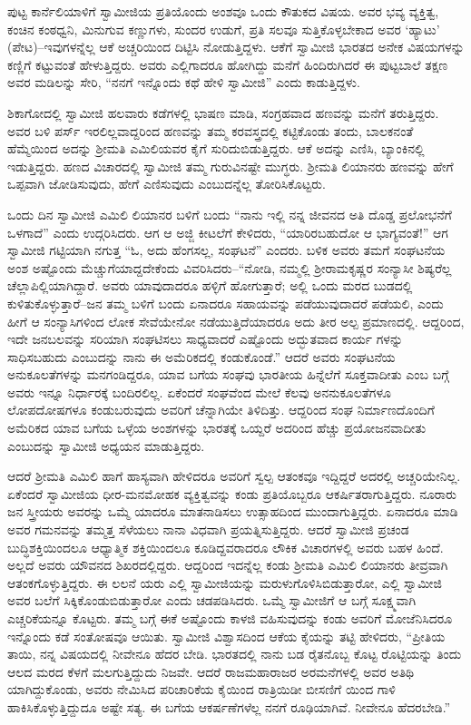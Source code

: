 ಪುಟ್ಟ ಕಾರ್ನೆಲಿಯಾಳಿಗೆ ಸ್ವಾಮೀಜಿಯ ಪ್ರತಿಯೊಂದು ಅಂಶವೂ ಒಂದು ಕೌತುಕದ ವಿಷಯ. ಅವರ ಭವ್ಯ ವ್ಯಕ್ತಿತ್ವ, ಕಂಚಿನ ಕಂಠಧ್ವನಿ, ಮಿನುಗುವ ಕಣ್ಣುಗಳು, ಸುಂದರ ಉಡುಗೆ, ಪ್ರತಿ ಸಲವೂ ಸುತ್ತಿಕೊಳ್ಳಬೇಕಾದ ಅವರ ‘ಹ್ಯಾಟು’ (ಪೇಟ)–ಇವುಗಳನ್ನೆಲ್ಲ ಆಕೆ ಅಚ್ಚರಿಯಿಂದ ದಿಟ್ಟಿಸಿ ನೋಡುತ್ತಿದ್ದಳು. ಆಕೆಗೆ ಸ್ವಾಮೀಜಿ ಭಾರತದ ಅನೇಕ ವಿಷಯಗಳನ್ನು ಕಣ್ಣಿಗೆ ಕಟ್ಟುವಂತೆ ಹೇಳುತ್ತಿದ್ದರು. ಅವರು ಎಲ್ಲಿಗಾದರೂ ಹೋಗಿದ್ದು ಮನೆಗೆ ಹಿಂದಿರುಗಿದರೆ ಈ ಪುಟ್ಟಬಾಲೆ ತಕ್ಷಣ ಅವರ ಮಡಿಲನ್ನು ಸೇರಿ, “ನನಗೆ ಇನ್ನೊಂದು ಕಥೆ ಹೇಳಿ ಸ್ವಾಮೀಜಿ” ಎಂದು ಕಾಡುತ್ತಿದ್ದಳು.

ಶಿಕಾಗೋದಲ್ಲಿ ಸ್ವಾಮೀಜಿ ಹಲವಾರು ಕಡೆಗಳಲ್ಲಿ ಭಾಷಣ ಮಾಡಿ, ಸಂಗ್ರಹವಾದ ಹಣವನ್ನು ಮನೆಗೆ ತರುತ್ತಿದ್ದರು. ಅವರ ಬಳಿ ಪರ್ಸ್ ಇರಲಿಲ್ಲವಾದ್ದರಿಂದ ಹಣವನ್ನು ತಮ್ಮ ಕರವಸ್ತ್ರದಲ್ಲಿ ಕಟ್ಟಿಕೊಂಡು ತಂದು, ಬಾಲಕನಂತೆ ಹೆಮ್ಮೆಯಿಂದ ಅದನ್ನು ಶ್ರೀಮತಿ ಎಮಿಲಿಯವರ ಕೈಗೆ ಸುರಿದುಬಿಡುತ್ತಿದ್ದರು. ಆಕೆ ಅದನ್ನು ಎಣಿಸಿ, ಬ್ಯಾಂಕಿನಲ್ಲಿ ಇಡುತ್ತಿದ್ದರು. ಹಣದ ವಿಚಾರದಲ್ಲಿ ಸ್ವಾಮೀಜಿ ತಮ್ಮ ಗುರುವಿನಷ್ಟೇ ಮುಗ್ಧರು. ಶ್ರೀಮತಿ ಲಿಯಾನರು ಹಣವನ್ನು ಹೇಗೆ ಒಪ್ಪವಾಗಿ ಜೋಡಿಸುವುದು, ಹೇಗೆ ಎಣಿಸುವುದು ಎಂಬುದನ್ನೆಲ್ಲ ತೋರಿಸಿಕೊಟ್ಟರು.

ಒಂದು ದಿನ ಸ್ವಾಮೀಜಿ ಎಮಿಲಿ ಲಿಯಾನರ ಬಳಿಗೆ ಬಂದು “ನಾನು ಇಲ್ಲಿ ನನ್ನ ಜೀವನದ ಅತಿ ದೊಡ್ಡ ಪ್ರಲೋಭನೆಗೆ ಒಳಗಾದೆ” ಎಂದು ಉದ್ಗರಿಸಿದರು. ಆಗ ಆ ಅಜ್ಜಿ ಕೀಟಲೆಗೆ ಕೇಳಿದರು, “ಯಾರಿರಬಹುದೋ ಆ ಭಾಗ್ಯವಂತೆ!” ಆಗ ಸ್ವಾಮೀಜಿ ಗಟ್ಟಿಯಾಗಿ ನಗುತ್ತ “ಓ, ಅದು ಹೆಂಗಸಲ್ಲ, ಸಂಘಟನೆ” ಎಂದರು. ಬಳಿಕ ಅವರು ತಮಗೆ ಸಂಘಟನೆಯ ಅಂಶ ಅಷ್ಟೊಂದು ಮೆಚ್ಚುಗೆಯಾದ್ದದೇಕೆಂದು ವಿವರಿಸಿದರು–“ನೋಡಿ, ನಮ್ಮಲ್ಲಿ ಶ್ರೀರಾಮಕೃಷ್ಣರ ಸಂನ್ಯಾಸೀ ಶಿಷ್ಯರೆಲ್ಲ ಚೆಲ್ಲಾಪಿಲ್ಲಿಯಾಗಿದ್ದಾರೆ. ಅವರು ಯಾವುದಾದರೂ ಹಳ್ಳಿಗೆ ಹೋಗುತ್ತಾರೆ; ಅಲ್ಲಿ ಒಂದು ಮರದ ಬುಡದಲ್ಲಿ ಕುಳಿತುಕೊಳ್ಳುತ್ತಾರೆ–ಜನ ತಮ್ಮ ಬಳಿಗೆ ಬಂದು ಏನಾದರೂ ಸಹಾಯವನ್ನು ಪಡೆಯುವುದಾದರೆ ಪಡೆಯಲಿ, ಎಂದು ಹೀಗೆ ಆ ಸಂನ್ಯಾಸಿಗಳಿಂದ ಲೋಕ ಸೇವೆಯೇನೋ ನಡೆಯುತ್ತಿದೆಯಾದರೂ ಅದು ತೀರ ಅಲ್ಪ ಪ್ರಮಾಣದಲ್ಲಿ. ಆದ್ದರಿಂದ, ಇದೇ ಜನಬಲವನ್ನು ಸರಿಯಾಗಿ ಸಂಘಟಿಸಲು ಸಾಧ್ಯವಾದರೆ ಎಷ್ಟೊಂದು ಅದ್ಭುತವಾದ ಕಾರ್ಯ ಗಳನ್ನು ಸಾಧಿಸಬಹುದು ಎಂಬುದನ್ನು ನಾನು ಈ ಅಮೆರಿಕದಲ್ಲಿ ಕಂಡುಕೊಂಡೆ.” ಆದರೆ ಅವರು ಸಂಘಟನೆಯ ಅನುಕೂಲತೆಗಳನ್ನು ಮನಗಂಡಿದ್ದರೂ, ಯಾವ ಬಗೆಯ ಸಂಘವು ಭಾರತೀಯ ಹಿನ್ನೆಲೆಗೆ ಸೂಕ್ತವಾದೀತು ಎಂಬ ಬಗ್ಗೆ ಅವರು ಇನ್ನೂ ನಿರ್ಧಾರಕ್ಕೆ ಬಂದಿರಲಿಲ್ಲ. ಏಕೆಂದರೆ ಸಂಘವೆಂದ ಮೇಲೆ ಕೆಲವು ಅನನುಕೂಲತೆಗಳೂ ಲೋಪದೋಷಗಳೂ ಕಂಡುಬರುವುದು ಅವರಿಗೆ ಚೆನ್ನಾಗಿಯೇ ತಿಳಿದಿತ್ತು. ಆದ್ದರಿಂದ ಸಂಘ ನಿರ್ಮಾಣದೊಂದಿಗೆ ಅಮೆರಿಕದ ಯಾವ ಬಗೆಯ ಒಳ್ಳೆಯ ಅಂಶಗಳನ್ನು ಭಾರತಕ್ಕೆ ಒಯ್ದರೆ ಅದರಿಂದ ಹೆಚ್ಚು ಪ್ರಯೋಜನವಾದೀತು ಎಂಬುದನ್ನು ಸ್ವಾಮೀಜಿ ಅಧ್ಯಯನ ಮಾಡುತ್ತಿದ್ದರು.

ಆದರೆ ಶ್ರೀಮತಿ ಎಮಿಲಿ ಹಾಗೆ ಹಾಸ್ಯವಾಗಿ ಹೇಳಿದರೂ ಅವರಿಗೆ ಸ್ವಲ್ಪ ಆತಂಕವೂ ಇದ್ದಿದ್ದರೆ ಅದರಲ್ಲಿ ಅಚ್ಚರಿಯೇನಿಲ್ಲ. ಏಕೆಂದರೆ ಸ್ವಾಮೀಜಿಯ ಧೀರ-ಮನಮೋಹಕ ವ್ಯಕ್ತಿತ್ವವನ್ನು ಕಂಡು ಪ್ರತಿಯೊಬ್ಬರೂ ಆಕರ್ಷಿತರಾಗುತ್ತಿದ್ದರು. ನೂರಾರು ಜನ ಸ್ತ್ರೀಯರು ಅವರನ್ನು ಒಮ್ಮೆ ಯಾದರೂ ಮಾತನಾಡಿಸಲು ಉತ್ಸಾಹದಿಂದ ಮುಂದಾಗುತ್ತಿದ್ದರು. ಏನಾದರೂ ಮಾಡಿ ಅವರ ಗಮನವನ್ನು ತಮ್ಮತ್ತ ಸೆಳೆಯಲು ನಾನಾ ವಿಧವಾಗಿ ಪ್ರಯತ್ನಿಸುತ್ತಿದ್ದರು. ಆದರೆ ಸ್ವಾಮೀಜಿ ಪ್ರಚಂಡ ಬುದ್ಧಿಶಕ್ತಿಯಿಂದಲೂ ಆಧ್ಯಾತ್ಮಿಕ ಶಕ್ತಿಯಿಂದಲೂ ಕೂಡಿದ್ದವರಾದರೂ ಲೌಕಿಕ ವಿಚಾರಗಳಲ್ಲಿ ಅವರು ಬಹಳ ಹಿಂದೆ. ಅಲ್ಲದೆ ಅವರು ಯೌವನದ ಶಿಖರದಲ್ಲಿದ್ದರು. ಆದ್ದರಿಂದ ಇದನ್ನೆಲ್ಲ ಕಂಡು ಶ್ರೀಮತಿ ಎಮಿಲಿ ಲಿಯಾನರು ತೀವ್ರವಾಗಿ ಆತಂಕಗೊಳ್ಳುತ್ತಿದ್ದರು. ಈ ಲಲನೆ ಯರು ಎಲ್ಲಿ ಸ್ವಾಮೀಜಿಯನ್ನು ಮರುಳುಗೊಳಿಸಿಬಿಡುತ್ತಾರೋ, ಎಲ್ಲಿ ಸ್ವಾಮೀಜಿ ಅವರ ಬಲೆಗೆ ಸಿಕ್ಕಿಕೊಂಡುಬಿಡುತ್ತಾರೋ ಎಂದು ಚಡಪಡಿಸಿದರು. ಒಮ್ಮೆ ಸ್ವಾಮೀಜಿಗೆ ಆ ಬಗ್ಗೆ ಸೂಕ್ಷ್ಮವಾಗಿ ಎಚ್ಚರಿಕೆಯನ್ನೂ ಕೊಟ್ಟರು. ತಮ್ಮ ಬಗ್ಗೆ ಈಕೆ ಅಷ್ಟೊಂದು ಕಾಳಜಿ ವಹಿಸುವುದನ್ನು ಕಂಡು ಅವರಿಗೆ ಮೋಜೆನಿಸಿದರೂ ಇನ್ನೊಂದು ಕಡೆ ಸಂತೋಷವೂ ಆಯಿತು. ಸ್ವಾಮೀಜಿ ವಿಶ್ವಾಸದಿಂದ ಆಕೆಯ ಕೈಯನ್ನು ತಟ್ಟಿ ಹೇಳಿದರು, “ಪ್ರೀತಿಯ ತಾಯಿ, ನನ್ನ ವಿಷಯದಲ್ಲಿ ನೀವೇನೂ ಹೆದರ ಬೇಡಿ. ಭಾರತದಲ್ಲಿ ನಾನು ಬಡ ರೈತನೊಬ್ಬ ಕೊಟ್ಟ ರೊಟ್ಟಿಯನ್ನು ತಿಂದು ಆಲದ ಮರದ ಕೆಳಗೆ ಮಲಗುತ್ತಿದ್ದುದು ನಿಜವೇ. ಆದರೆ ರಾಜಮಹಾರಾಜರ ಅರಮನೆಗಳಲ್ಲಿ ಅವರ ಅತಿಥಿ ಯಾಗಿದ್ದುಕೊಂಡು, ಅವರು ನೇಮಿಸಿದ ಪರಿಚಾರಿಕೆಯ ಕೈಯಿಂದ ರಾತ್ರಿಯಿಡೀ ಬೀಸಣಿಗೆ ಯಿಂದ ಗಾಳಿ ಹಾಕಿಸಿಕೊಳ್ಳುತ್ತಿದ್ದುದೂ ಅಷ್ಟೇ ಸತ್ಯ. ಈ ಬಗೆಯ ಆಕರ್ಷಣೆಗಳೆಲ್ಲ ನನಗೆ ರೂಢಿಯಾಗಿವೆ. ನೀವೇನೂ ಹೆದರಬೇಡಿ.”

